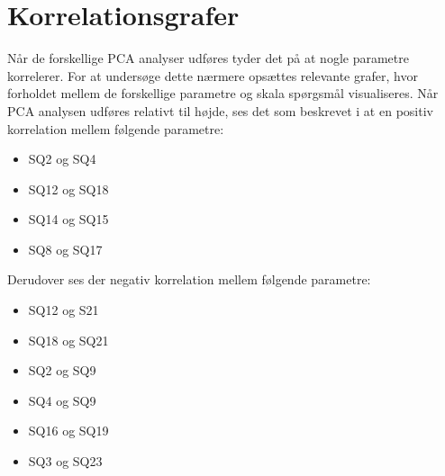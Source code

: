 \section{Korrelationsgrafer}
\label{DatabehandlingKorrelationsgrafer}
Når de forskellige PCA analyser udføres tyder det på at nogle parametre korrelerer. For at undersøge dette nærmere opsættes relevante grafer, hvor forholdet mellem de forskellige parametre og skala spørgsmål visualiseres. \blankline
%
Når PCA analysen udføres relativt til højde, ses det som beskrevet i  at en positiv korrelation mellem følgende parametre:
\begin{itemize}
	\item SQ2 og SQ4
	\item SQ12 og SQ18
	\item SQ14 og SQ15
	\item SQ8 og SQ17
\end{itemize}
%
Derudover ses der negativ korrelation mellem følgende parametre:
\begin{itemize}
	\item SQ12 og S21
	\item SQ18 og SQ21
	\item SQ2 og SQ9
	\item SQ4 og SQ9
	\item SQ16 og SQ19
	\item SQ3 og SQ23
\end{itemize}
%